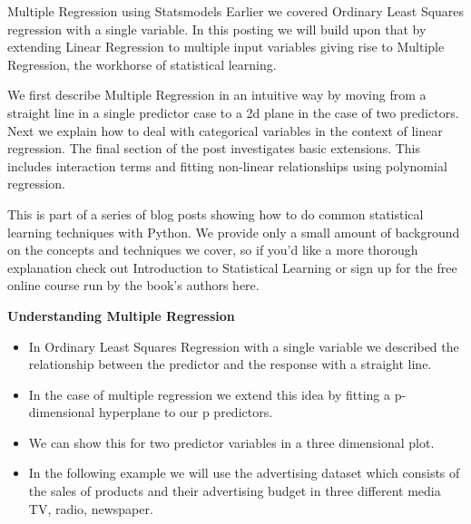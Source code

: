 \begin{frame}[fragile]
	\Large
	Multiple Regression using Statsmodels
Earlier we covered Ordinary Least Squares regression with a single variable. In this posting we will build upon that by extending Linear Regression to multiple input variables giving rise to Multiple Regression, the workhorse of statistical learning.
\end{frame}

\begin{frame}[fragile]
	\Large
We first describe Multiple Regression in an intuitive way by moving from a straight line in a single predictor case to a 2d plane in the case of two predictors. Next we explain how to deal with categorical variables in the context of linear regression. The final section of the post investigates basic extensions. This includes interaction terms and fitting non-linear relationships using polynomial regression.
\end{frame}

\begin{frame}[fragile]
	\Large
This is part of a series of blog posts showing how to do common statistical learning techniques with Python. We provide only a small amount of background on the concepts and techniques we cover, so if you’d like a more thorough explanation check out Introduction to Statistical Learning or sign up for the free online course run by the book’s authors here.
\end{frame}

\begin{frame}[fragile]
	\Large
\textbf{Understanding Multiple Regression}
\begin{itemize}
\item In Ordinary Least Squares Regression with a single variable we described the relationship between the predictor and the response with a straight line. 
\item In the case of multiple regression we extend this idea by fitting a p-dimensional hyperplane to our p predictors.
\end{itemize}

\end{frame}

\begin{frame}[fragile]
	\Large
\begin{itemize}
\item We can show this for two predictor variables in a three dimensional plot. 
\item In the following example we will use the advertising dataset which consists of the sales of products and their advertising budget in three different media TV, radio, newspaper.
\end{itemize}

\end{frame}

